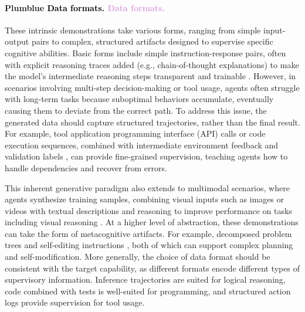 \documentclass{article}
\let\oldtextcolor\textcolor
\renewcommand{\textcolor}[2]{
  \def\temp{#1}
  \def\red{blue}
  \ifx\temp\red
    \oldtextcolor{black}{#2}
  \else
    \oldtextcolor{#1}{#2}
  \fi
}
\begin{document}
\paragraph{\textcolor{Plum}{Data formats.}} These intrinsic demonstrations take various forms, ranging from simple input-output pairs to complex, structured artifacts designed to supervise specific cognitive abilities. Basic forms include simple instruction-response pairs, often with explicit reasoning traces added (e.g., chain-of-thought explanations) to make the model's intermediate reasoning steps transparent and trainable \citep{huang2023large}. 
However, in scenarios involving multi-step decision-making or tool usage, agents often struggle with long-term tasks because suboptimal behaviors accumulate, eventually causing them to deviate from the correct path. To address this issue, the generated data should capture structured trajectories, rather than the final result. For example, tool application programming interface (API) calls or code execution sequences, combined with intermediate environment feedback and validation labels \citep{shi2025taskcraft, singh2023beyond}, can provide fine-grained supervision, teaching agents how to handle dependencies and recover from errors.


This inherent generative paradigm also extends to multimodal scenarios, where agents synthesize training samples, combining visual inputs such as images or videos with textual descriptions and reasoning to improve performance on tasks including visual reasoning \citep{zhang2025will}. At a higher level of abstraction, these demonstrations can take the form of metacognitive artifacts. For example, decomposed problem trees \citep{simonds2025ladder} and self-editing instructions \citep{zweiger2025selfadapting}, both of which can support complex planning and self-modification. More generally, the choice of data format should be consistent with the target capability, as different formats encode different types of supervisory information. Inference trajectories are suited for logical reasoning, code combined with tests is well-suited for programming, and structured action logs provide supervision for tool usage.
\end{document}
